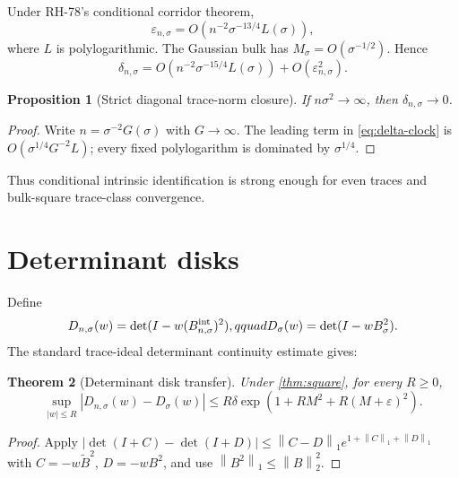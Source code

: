 \documentclass[11pt]{article}
\newtheorem{theorem}{Theorem}[section]
\newtheorem{proposition}[theorem]{Proposition}
\newcommand{\norm}[1]{\left\lVert#1\right\rVert}
\begin{document}
Under RH-78's conditional corridor theorem,
\begin{equation}
 \varepsilon_{n,\sigma}
 =O\!\left(n^{-2}\sigma^{-13/4}L(\sigma)\right),
 \label{eq:epsilon}
\end{equation}
where $L$ is polylogarithmic.  The Gaussian bulk has
$M_\sigma=O(\sigma^{-1/2})$.  Hence
\begin{equation}
 \delta_{n,\sigma}
 =O\!\left(n^{-2}\sigma^{-15/4}L(\sigma)\right)
 +O(\varepsilon_{n,\sigma}^2).
 \label{eq:delta-clock}
\end{equation}

\begin{proposition}[Strict diagonal trace-norm closure]
\label{prop:diagonal}
If $n\sigma^2\to\infty$, then $\delta_{n,\sigma}\to0$.
\end{proposition}

\begin{proof}
Write $n=\sigma^{-2}G(\sigma)$ with $G\to\infty$.  The leading term in
\eqref{eq:delta-clock} is
$O(\sigma^{1/4}G^{-2}L)$; every fixed polylogarithm is dominated by
$\sigma^{1/4}$.
\end{proof}

Thus conditional intrinsic identification is strong enough for even traces
and bulk-square trace-class convergence.

\section{Determinant disks}

Define
\[
 D_{n,\sigma}(w)=\det(I-w(B^{\rm int}_{n,\sigma})^2),qquad
 D_\sigma(w)=\det(I-wB_\sigma^2).
\]
The standard trace-ideal determinant continuity estimate
\citep{Simon2005} gives:

\begin{theorem}[Determinant disk transfer]
\label{thm:determinant}
Under \cref{thm:square}, for every $R\ge0$,
\begin{equation}
 \sup_{|w|\le R}|D_{n,\sigma}(w)-D_\sigma(w)|
 \le R\delta
 \exp\!\left(1+RM^2+R(M+\varepsilon)^2\right).
 \label{eq:det-bound}
\end{equation}
\end{theorem}

\begin{proof}
Apply
$|\det(I+C)-\det(I+D)|\le\norm{C-D}_1
e^{1+\norm C_1+\norm D_1}$ with
$C=-w\widetilde B^2$, $D=-wB^2$, and use
$\norm{B^2}_1\le\norm B_2^2$.
\end{proof}
\end{document}
